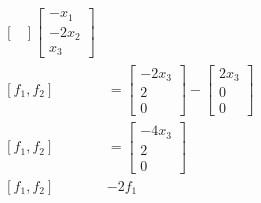 {\begin{equation}
\begin{aligned}
\begin{bmatrix}
            \end{bmatrix}\begin{bmatrix}
                -x_1   \\
                -2x_2\\
                x_3
            \end{bmatrix}
                     &\mbox{}\\[1.25ex]
                [f_1,f_2]&=\begin{bmatrix}
                    -2x_3  \\
                    2\\
                    0
                \end{bmatrix} - \begin{bmatrix}
                    2x_3  \\
                    0\\
                    0
                \end{bmatrix}&\mbox{}\\[1.25ex]
                    [f_1,f_2]&=\begin{bmatrix}
                        -4x_3  \\
                        2\\
                        0
                    \end{bmatrix}&\mbox{}\\[1.25ex]
                        [f_1,f_2]&-2f_1&\mbox{}\\[1.25ex]
           
                     
            
        \end{aligned}
    \end{equation}

}






